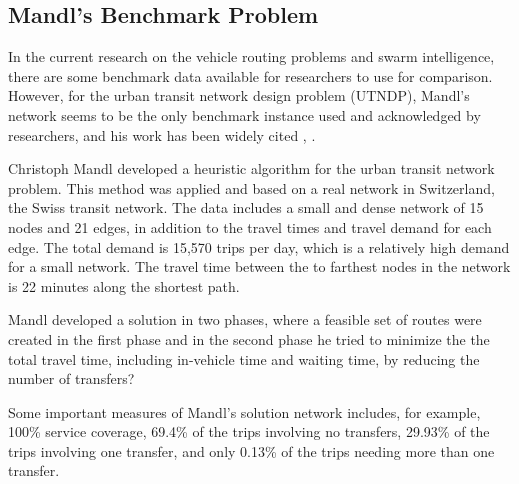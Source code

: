 \subsection{Mandl's Benchmark Problem}

In the current research on the vehicle routing problems and swarm intelligence, there are some benchmark data available for researchers to use for comparison. However, for the urban transit network design problem (UTNDP), Mandl's network seems to be the only benchmark instance used and acknowledged by researchers, and his work has been widely cited \citep{fan09}, \citep{kechagiopoulos14}. %

Christoph Mandl \citep{mandl79} developed a heuristic algorithm for the urban transit network problem. This method was applied and based on a real network in Switzerland, the Swiss transit network\citep{mandl80}. The data includes a small and dense network of 15 nodes and 21 edges, in addition to the travel times and travel demand for each edge. The total demand is 15,570 trips per day, which is a relatively high demand for a small network. The travel time between the to farthest nodes in the network is 22 minutes along the shortest path. 

Mandl developed a solution in two phases, where a feasible set of routes were created in the first phase and in the second phase he tried to minimize the the total travel time, including in-vehicle time and waiting time, by reducing the number of transfers?


Some important measures of Mandl's solution network includes, for example, 100\% service coverage, 69.4\% of the trips involving no transfers, 29.93\% of the trips involving one transfer, and only 0.13\% of the trips needing more than one transfer. %






